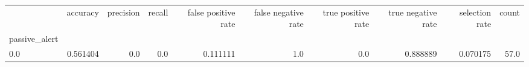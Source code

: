 \begin{tabular}{lrrrrrrrrr}
\toprule
{} &  accuracy &  precision &  recall &  false positive rate &  false negative rate &  true positive rate &  true negative rate &  selection rate &  count \\
passive\_alert &           &            &         &                      &                      &                     &                     &                 &        \\
\midrule
0.0           &  0.561404 &        0.0 &     0.0 &             0.111111 &                  1.0 &                 0.0 &            0.888889 &        0.070175 &   57.0 \\
\bottomrule
\end{tabular}
